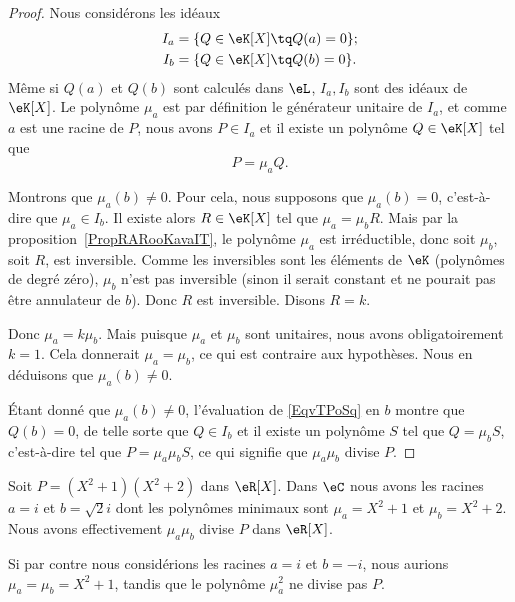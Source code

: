 \begin{proof}
	Nous considérons les idéaux
	\begin{subequations}
		\begin{align}
			I_a & =\{ Q\in \eK[X]\tq Q(a)=0 \}; \\
			I_b & =\{ Q\in \eK[X]\tq Q(b)=0 \}.
		\end{align}
	\end{subequations}
	Même si \( Q(a)\) et \(Q(b)\) sont calculés dans \( \eL\), \( I_a, I_b\) sont des idéaux de \( \eK[X]\). Le polynôme \( \mu_a\) est par définition le générateur unitaire de \( I_a\), et comme \( a\) est une racine de \( P\), nous avons \( P\in I_a\) et il existe un polynôme \( Q\in \eK[X]\) tel que
	\begin{equation}    \label{EqvTPoSq}
		P=\mu_aQ.
	\end{equation}

	Montrons que \( \mu_a(b)\neq 0\). Pour cela, nous  supposons que \( \mu_a(b)=0\), c'est-à-dire que \( \mu_a\in I_b\). Il existe alors \( R\in \eK[X]\) tel que \( \mu_a=\mu_bR\). Mais par la proposition~\ref{PropRARooKavaIT}, le polynôme \( \mu_a\) est irréductible, donc soit \( \mu_b\), soit \( R\), est inversible. Comme les inversibles sont les éléments de \( \eK\) (polynômes de degré zéro), \( \mu_b\) n'est pas inversible (sinon il serait constant et ne pourait pas être annulateur de \( b\)). Donc \( R\) est inversible. Disons \( R=k\).

	Donc \( \mu_a=k\mu_b\). Mais puisque \( \mu_a\) et \( \mu_b\) sont unitaires, nous avons obligatoirement \( k=1\). Cela donnerait \( \mu_a=\mu_b\), ce qui est contraire aux hypothèses. Nous en déduisons que \( \mu_a(b)\neq 0\).

	Étant donné que \( \mu_a(b)\neq 0\), l'évaluation de \eqref{EqvTPoSq} en \( b\) montre que \( Q(b)=0\), de telle sorte que \( Q\in I_b\) et il existe un polynôme \( S\) tel que \( Q=\mu_bS\), c'est-à-dire tel que \( P=\mu_a\mu_bS\), ce qui signifie que \( \mu_a\mu_b\) divise \( P\).
\end{proof}

\begin{example}
	Soit \( P=(X^2+1)(X^2+2)\) dans \( \eR[X]\). Dans \( \eC\) nous avons les racines \( a=i\) et \( b=\sqrt{2}i\) dont les polynômes minimaux sont \( \mu_a=X^2+1\) et \( \mu_b=X^2+2\). Nous avons effectivement \( \mu_a\mu_b\) divise \( P\) dans \( \eR[X]\).

	Si par contre nous considérions les racines \( a=i\) et \( b=-i\), nous aurions \( \mu_a=\mu_b=X^2+1\), tandis que le polynôme \( \mu_a^2\) ne divise pas \( P\).
\end{example}




